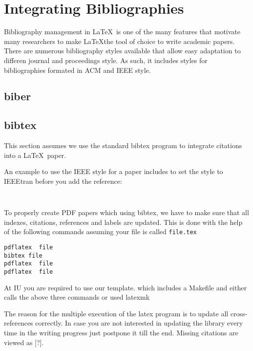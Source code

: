 \FILENAME

\section{Integrating Bibliographies}\label{S:bibliographies}

Bibliography management in \LaTeX\ is one of the many features that
motivate many researchers to make \LaTeX the tool of choice to write
academic papers. There are numerous bibliography styles available that
allow easy adaptation to differen journal and proceedings style. As
such, it includes styles for bibliographies formated in ACM and IEEE
style.

\subsection{biber}


\subsection{bibtex}

This section assumes we use the standard bibtex program to integrate
citations into a \LaTeX\ paper.

An example to use the IEEE style for a paper includes to set
the style to IEEEtran before you add the reference:

\begin{verbatim}


\end{verbatim}

To properly create PDF papers which using bibtex, we have to make sure
that all indexes, citations, references and labels are updated. This
is done with the help of the following commands assuming your file is
called \verb|file.tex|

\begin{verbatim}
pdflatex  file
bibtex file
pdflatex  file
pdflatex  file
\end{verbatim}


\begin{IU}
At IU you are required to use our template. which includes a Makefile
and either calls the above three commands or used latexmk
\end{IU}

The reason for the multiple execution of the latex program is to update
all cross-references correctly. In case you are not interested in
updating the library every time in the writing progress just postpone it
till the end. Missing citations are viewed as {[}?{]}.


